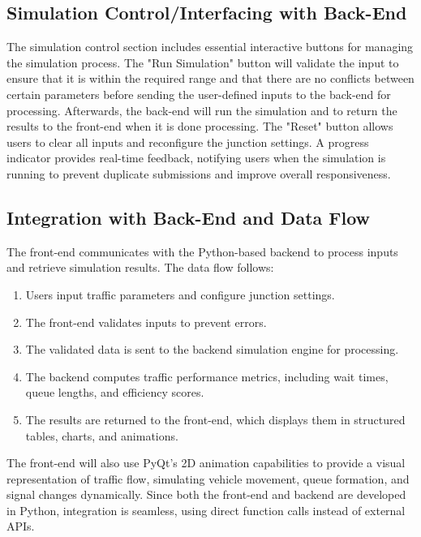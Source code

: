 \documentclass{article}
\begin{document}
\subsection{Simulation Control/Interfacing with Back-End}
The simulation control section includes essential interactive buttons for managing the
simulation process. The "Run Simulation" button will validate the input to ensure that it is within the required range and that there are no conflicts between certain parameters before sending the user-defined inputs to the back-end
for processing. Afterwards, the back-end will run the simulation and to return the results to the front-end when it is done processing. 
The "Reset" button allows users to clear all inputs and reconfigure the
junction settings. A progress indicator provides real-time feedback, notifying users when the
simulation is running to prevent duplicate submissions and improve overall responsiveness.

\subsection{Integration with Back-End and Data Flow}
The front-end communicates with the Python-based backend to process inputs and retrieve simulation results. The data flow follows:
\begin{enumerate}
    \item Users input traffic parameters and configure junction settings.
    \item The front-end validates inputs to prevent errors.
    \item The validated data is sent to the backend simulation engine for processing.
    \item The backend computes traffic performance metrics, including wait times, queue lengths, and efficiency scores.
    \item The results are returned to the front-end, which displays them in structured tables, charts, and animations.
\end{enumerate}

The front-end will also use PyQt’s 2D animation capabilities to provide a visual
representation of traffic flow, simulating vehicle movement, queue formation, and signal
changes dynamically. Since both the front-end and backend are developed in Python,
integration is seamless, using direct function calls instead of external APIs.
\end{document}
